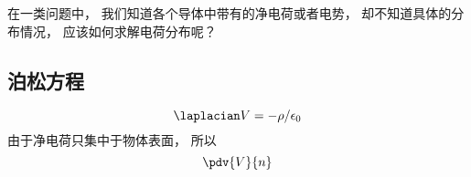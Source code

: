 
\begin{issues}
\issueDraft
\end{issues}

在一类问题中， 我们知道各个导体中带有的净电荷或者电势， 却不知道具体的分布情况， 应该如何求解电荷分布呢？

\subsection{泊松方程}
\begin{equation}
\laplacian V = -\rho/\epsilon_0
\end{equation}
由于净电荷只集中于物体表面， 所以
\begin{equation}
\pdv{V}{n}
\end{equation}

